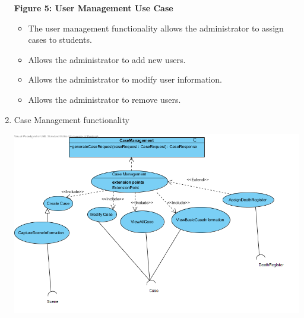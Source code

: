 \documentclass[10pt,a4paper]{article}
\begin{document}
\begin{enumerate}
\begin{center}
		\textbf{Figure 5: User Management Use Case}
	\end{center}
	\begin{itemize}
		\item The user management functionality allows the administrator to assign cases to students.
		\item Allows the administrator to add new users.
		\item Allows the administrator to modify user information.
		\item Allows the administrator to remove users.
	\end{itemize}
	\item Case Management functionality
	\begin{center}
		\includegraphics[scale=0.4]{CaseManagementUseCase.png}
		

\end{center}
\end{enumerate}
\end{document}
